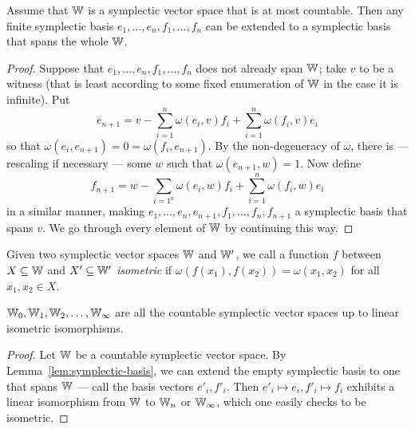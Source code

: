 \begin{lemma}\label{lem:symplectic-basis}
    Assume that $\mathbb{W}$ is a symplectic vector space that is at most countable.
    Then any finite symplectic basis $e_1, \ldots, e_n, f_1, \ldots, f_n$ 
    can be extended to a symplectic basis that spans the whole $\mathbb{W}$.
\end{lemma}
\begin{proof}
    Suppose that $e_1, \ldots, e_n, f_1, \ldots, f_n$ does not already span $\mathbb{W}$;
    take $v$ to be a witness (that is least according to some fixed enumeration of $\mathbb{W}$ 
    in the case it is infinite).
    Put
    \[
        e_{n+1} = v - \sum_{i=1}^n \omega(e_i, v) f_i + \sum_{i=1}^n \omega(f_i, v) e_i
    \]
    so that $\omega(e_i, e_{n+1}) = 0 = \omega(f_i, e_{n+1})$.
    By the non-degeneracy of $\omega$, there is --- rescaling if necessary 
    --- some $w$ such that $\omega(e_{n+1}, w) = 1$. 
    Now define
    \[
        f_{n+1} = w - \sum_{i=1^n} \omega(e_i, w) f_i + \sum_{i=1}^n \omega(f_i, w) e_i
    \]
    in a similar manner, 
    making $e_1, \ldots, e_n, e_{n+1}, f_1, \ldots, f_n, f_{n+1}$ a symplectic basis that spans $v$.
    We go through every element of $\mathbb{W}$ by continuing this way.
\end{proof}

Given two symplectic vector spaces $\mathbb{W}$ and $\mathbb{W}'$,
we call a function $f$ between $X \subseteq \mathbb{W}$ and $X' \subseteq \mathbb{W}'$ \emph{isometric} if 
$\omega(f(x_1), f(x_2)) = \omega(x_1, x_2)$ for all $x_1, x_2 \in X$.

\begin{proposition}\label{prop:symplectic-unique-by-dimension}
    $\mathbb{W}_0, \mathbb{W}_1, \mathbb{W}_2, \ldots, \mathbb{W}_\infty$ are all the countable symplectic vector spaces 
    up to linear isometric isomorphisms.
\end{proposition}
\begin{proof}
    Let $\mathbb{W}$ be a countable symplectic vector space.
    By Lemma~\ref{lem:symplectic-basis}, we can extend the empty symplectic basis to one that spans $\mathbb{W}$ 
    --- call the basis vectors $e'_i, f'_i$.
    Then $e'_i \mapsto e_i, f'_i \mapsto f_i$ exhibits a linear isomorphism from $\mathbb{W}$ 
    to $\mathbb{W}_n$ or $\mathbb{W}_\infty$, which one easily checks to be isometric.
\end{proof}

